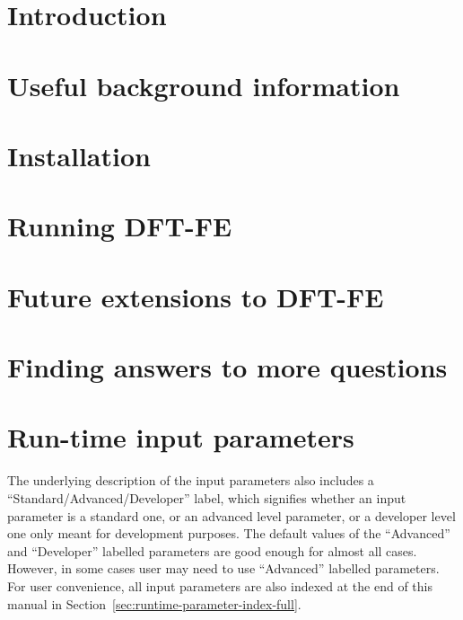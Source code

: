 \documentclass{article}
\newcommand{\dftfe}{\textsc{DFT-FE}}
\begin{document}

\pagebreak

\tableofcontents

\pagebreak

\section{Introduction}
\label{sec:intro}


\section{Useful background information}
\label{sec:background}


\section{Installation}
\label{sec:installation}


\section{Running \dftfe}
\label{sec:run}


\section{Future extensions to \dftfe}
\label{sec:future}


\section{Finding answers to more questions}
\label{sec:questions-and-answers}


\appendix

\section{Run-time input parameters}
\label{sec:parameters}
The underlying description of the input parameters also includes a ``Standard/Advanced/Developer'' label, which signifies whether an input parameter is
a standard one, or an advanced level parameter, or a developer level one only meant for development purposes. The default values of the ``Advanced'' and ``Developer'' labelled parameters are good enough for almost all cases. However, in some cases user may need to use ``Advanced'' labelled parameters. For user convenience,
all input parameters are also indexed at the end of this manual in Section~\ref{sec:runtime-parameter-index-full}.

\end{document}
